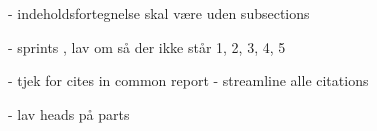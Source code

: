 - indeholdsfortegnelse skal være uden subsections

- sprints , lav om så der ikke står 1, 2, 3, 4, 5

- tjek for cites in common report - streamline alle citations

- lav heads på parts

